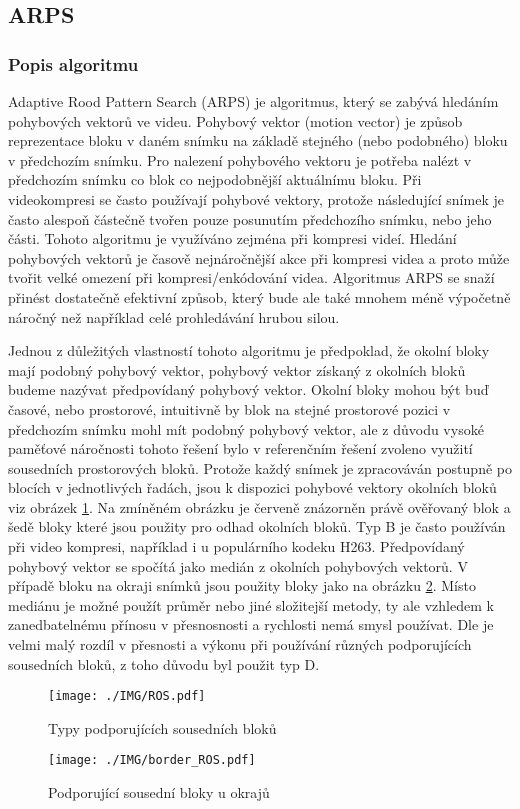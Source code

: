 \documentclass[thesis=M,czech]{FITthesis}[2016/06/26]
\begin{document}
\subsection {ARPS}
\subsubsection{Popis algoritmu}
Adaptive Rood Pattern Search (ARPS)\cite{ARPS} je algoritmus, který se zabývá hledáním pohybových vektorů ve videu. Pohybový vektor (motion vector) je způsob reprezentace bloku v daném snímku na základě stejného (nebo podobného) bloku v předchozím snímku. Pro nalezení pohybového vektoru je potřeba nalézt v předchozím snímku co blok co nejpodobnější aktuálnímu bloku. Při videokompresi se často používají pohybové vektory, protože následující snímek je často alespoň částečně tvořen pouze posunutím předchozího snímku, nebo jeho části.  Tohoto algoritmu je využíváno zejména při kompresi videí. Hledání pohybových vektorů je časově nejnáročnější akce při kompresi videa a proto může tvořit velké omezení při kompresi/enkódování videa. Algoritmus ARPS se snaží přinést dostatečně efektivní způsob, který bude ale také mnohem méně výpočetně náročný než například celé prohledávání hrubou silou. 

Jednou z důležitých vlastností tohoto algoritmu je předpoklad, že okolní bloky mají podobný pohybový vektor, pohybový vektor získaný z okolních bloků budeme nazývat předpovídaný pohybový vektor. Okolní bloky mohou být buď časové, nebo prostorové, intuitivně by blok na stejné prostorové pozici v předchozím snímku mohl mít podobný pohybový vektor, ale z důvodu vysoké paměťové náročnosti tohoto řešení bylo v referenčním řešení zvoleno využití sousedních prostorových bloků. Protože každý snímek je zpracováván postupně po blocích v jednotlivých řadách, jsou k dispozici pohybové vektory okolních bloků viz obrázek \ref{fig:nearby}. Na zmíněném obrázku je červeně znázorněn právě ověřovaný blok a šedě bloky které jsou použity pro odhad okolních bloků. Typ B je často používán při video kompresi, například i u populárního kodeku H263\cite{H263}. Předpovídaný pohybový vektor se spočítá jako medián z okolních pohybových vektorů. V případě bloku na okraji snímků jsou použity bloky jako na obrázku \ref{fig:border}. Místo mediánu je možné použít průměr nebo jiné složitejší metody, ty ale vzhledem k zanedbatelnému přínosu v přesnosnosti a rychlosti nemá smysl používat. Dle \cite{ARPS} je velmi malý rozdíl v přesnosti a výkonu při používání různých  podporujících sousedních bloků, z toho důvodu byl použit typ D.
\begin{figure}[h]\centering
\texttt{[image: ./IMG/ROS.pdf]}
\caption{Typy podporujících sousedních bloků}
\label{fig:nearby}
\end{figure}
\begin{figure}[h]\centering
\texttt{[image: ./IMG/border\_ROS.pdf]}
\caption{Podporující sousední bloky u okrajů}
\label{fig:border}
\end{figure}
\end{document}
